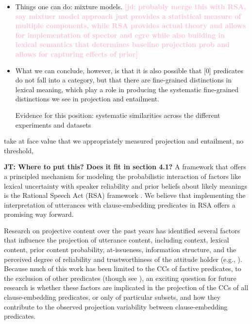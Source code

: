 \documentclass[11pt,fleqn]{article}
\newcommand{\jd}[1]{\textbf{\textcolor{Pink}{[jd: #1]}}}
\newcommand{\6}{\mbox{$[\hspace*{-.6mm}[$}}
\newcommand{\9}{\mbox{$]\hspace*{-.6mm}]$}}
\newcommand{\jt}[1]{\textbf{\color{blue}JT: #1}}
\begin{document}
\begin{itemize}

\item Things one can do: mixture models. \jd{probably merge this with RSA, say mixtuer model approach just provides a statistical measure of multiple components, while RSA provides actual theory and allows for implementation of spector and egre while also building in lexical semantics that determines baseline projection prob and allows for capturing effects of prior}

\item What we can conclude, however, is that it is also possible that [0] predicates do not fall into a category, but that there are fine-grained distinctions in lexical meaning, which play a role in producing the systematic fine-grained distinctions we see in projection and entailment.

Evidence for this position: systematic similarities across the different experiments and datasets

\end{itemize}

take at face value that we appropriately measured projection and entailment, no threshold, 


\jt{Where to put this? Does it fit in section 4.1?} A framework that offers a principled mechanism for modeling the probabilistic interaction of factors like lexical uncertainty with speaker reliability and prior beliefs about likely meanings  is the Rational Speech Act (RSA) framework \citep{bergen2016}. We believe that implementing the interpretation of utterances with clause-embedding predicates in RSA offers a promising way forward.


Research on projective content over the past years has identified several factors that influence the projection of utterance content, including context, lexical content, prior content probability, at-issueness, information structure, and the perceived degree of reliability and trustworthiness of the attitude holder (e.g., \citealt{gazdar79a,gazdar79b,beaver-belly,schlenker10,brst-salt10,best-question,abrusan2011,abrusan2016,anand-hacquard2014,cummins-rohde2015,djaerv-bacovcin-salt27,mahler-etal2020,mahler2020,tonhauser-salt26,tonhauser-guarani-variability,tbd-variability,tonhauser-etal-sub23,degen-tonhauser-openmind}). Because much of this work has been limited to the CCs of factive predicates, to the exclusion of other predicates (though see \citealt{djaerv-bacovcin-salt27,demarneffe-etal-sub23,mahler-etal2020,mahler2020,degen-tonhauser-openmind}), an exciting question for future research is whether these factors are implicated in the projection of the CCs of all clause-embedding predicates, or only of particular subsets, and how they contribute to the observed projection variability between clause-embedding predicates.
\end{document}

